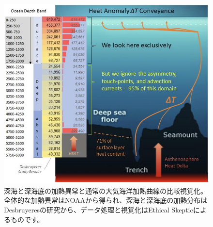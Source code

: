 \documentclass[10pt,twocolumn,letterpaper]{article}
\begin{document}
\begin{figure}[t]
\begin{center}
\includegraphics[width=1\textwidth]{deepsea.jpg}
\end{center}
   \caption{深海と深海底の加熱異常と通常の大気海洋加熱曲線の比較視覚化。全体的な加熱異常はNOAAから得られ\cite{147}、深海と深海底の加熱分布はDesbruyeresの研究から、データ処理と視覚化はEthical Skepticによるものです\cite{132,129}。}
\label{fig:21}
\end{figure}
\end{document}
